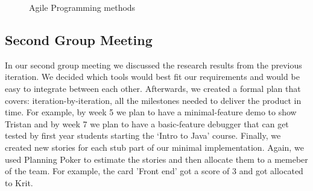 \documentclass[11pt, a4paper]{article}
\begin{document}
\begin{figure}[ht]
\centering
{}
\quad
{}
\caption{Agile Programming methods}
\label{fig:figure}
\end{figure}

\subsection{Second Group Meeting}
\indent In our second group meeting we discussed the research results from the previous iteration. We decided which tools would best fit our requirements and would be easy to integrate between each other. Afterwards, we created a formal plan that covers: iteration-by-iteration, all the milestones needed to deliver the product in time. For example, by week 5 we plan to have a minimal-feature demo to show Tristan and by week 7 we plan to have a basic-feature debugger that can get tested by first year students starting the `Intro to Java' course. Finally, we created new stories for each stub part of our minimal implementation. Again, we used Planning Poker to estimate the stories and then allocate them to a memeber of the team. For example, the card 'Front end' got a score of 3 and got allocated to Krit.
\end{document}
